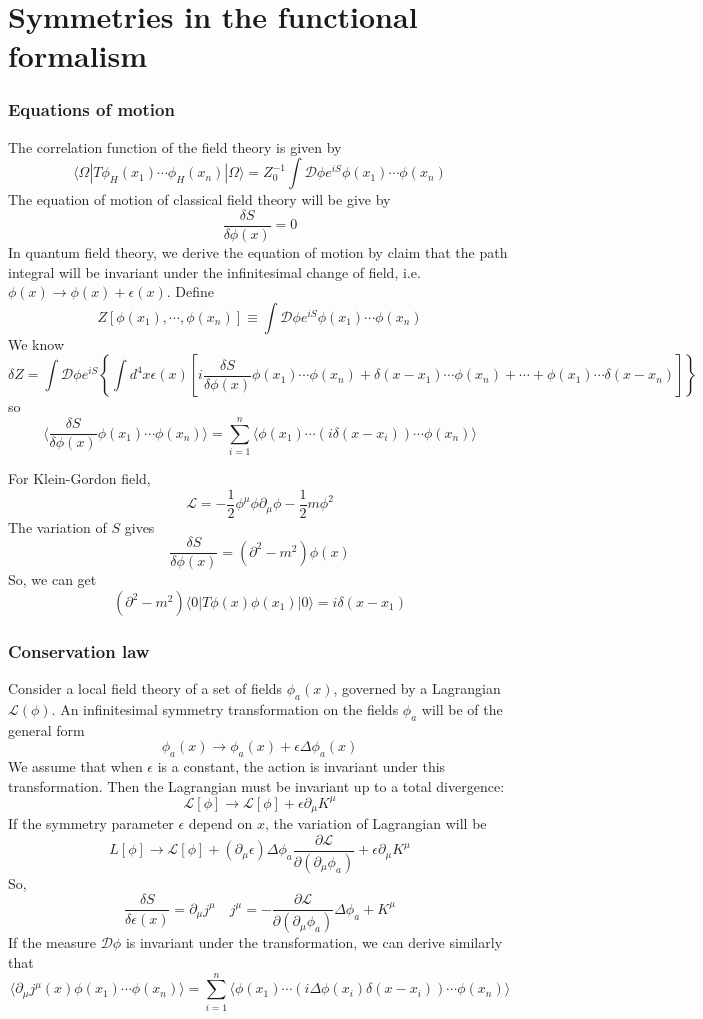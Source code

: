 \documentclass[cyan]{elegantnote}
\begin{document}
\section{Symmetries in the functional formalism}
\subsubsection{Equations of motion}
\noindent
The correlation function of the field theory is given by
\[\langle \Omega | T \phi_H(x_1) \cdots \phi_H(x_n) | \Omega \rangle = Z_0^{-1} \int \mathcal{D}\phi e^{iS} \phi(x_1)\cdots\phi(x_n)\]
The equation of motion of classical field theory will be give by
\[\frac{\delta S}{\delta \phi(x)} = 0\]
In quantum field theory, we derive the equation of motion by claim that the path integral will be invariant under the infinitesimal change of field, i.e. $\phi(x) \to \phi(x) + \epsilon(x)$.
Define
\[Z[\phi(x_1),\cdots,\phi(x_n)] \equiv  \int \mathcal{D}\phi e^{iS} \phi(x_1)\cdots\phi(x_n)\]
We know
\[\delta Z = \int \mathcal{D}\phi e^{iS} \left\{ \int d^4x \epsilon(x) \left[ i\frac{\delta S}{\delta \phi(x)} \phi(x_1)\cdots\phi(x_n) + \delta(x-x_1)\cdots\phi(x_n) + \cdots + \phi(x_1)\cdots\delta(x-x_n) \right]\right\} \]
so
\[\langle \frac{\delta S}{\delta \phi(x)} \phi(x_1)\cdots\phi(x_n) \rangle  = \sum_{i=1}^{n} \langle \phi(x_1) \cdots (i\delta(x-x_i)) \cdots \phi(x_n) \rangle\]
\begin{example}
For Klein-Gordon field,
\[\mathcal{L} = -\frac{1}{2}\phi^{\mu}\phi \partial_{\mu}\phi - \frac{1}{2}m\phi^2\]
The variation of $S$ gives
\[\frac{\delta S}{\delta \phi(x)} = (\partial^2-m^2)\phi(x)\]
So, we can get
\[(\partial^2-m^2) \langle 0 | T \phi(x)\phi(x_1)| 0 \rangle = i\delta(x-x_1)\]
\end{example}
\subsubsection{Conservation law}
Consider a local field theory of a set of fields $\phi_a(x)$, governed by a Lagrangian $\mathcal{L}(\phi)$. An infinitesimal symmetry transformation on the fields $\phi_a$ will be of the general form 
\[\phi_a(x) \to \phi_a(x) + \epsilon \Delta \phi_a(x)\]
We assume that when $\epsilon$ is a constant, the action is invariant under this transformation. Then the Lagrangian must be invariant up to a total divergence:
\[\mathcal{L}[\phi] \to \mathcal{L}[\phi] + \epsilon \partial_{\mu} K^{\mu}\]
If the symmetry parameter $\epsilon$ depend on $x$, the variation of Lagrangian will be
\[L[\phi] \to \mathcal{L}[\phi] + (\partial_{\mu}\epsilon)\Delta \phi_a \frac{\partial \mathcal{L}}{\partial (\partial_{\mu}\phi_a)} + \epsilon \partial_{\mu} K^{\mu}\]
So, 
\[\frac{\delta S}{\delta \epsilon(x)} = \partial_{\mu} j^{\mu} \quad j^{\mu} = -\frac{\partial \mathcal{L}}{\partial (\partial_{\mu}\phi_a)}\Delta \phi_a + K^{\mu} \]
If the measure $\mathcal{D}\phi$ is invariant under the transformation, we can derive similarly that
\[\langle \partial_{\mu} j^{\mu}(x) \phi(x_1)\cdots\phi(x_n) \rangle  = \sum_{i=1}^{n} \langle \phi(x_1) \cdots (i\Delta \phi(x_i)\delta(x-x_i)) \cdots \phi(x_n) \rangle\]
\end{document}
